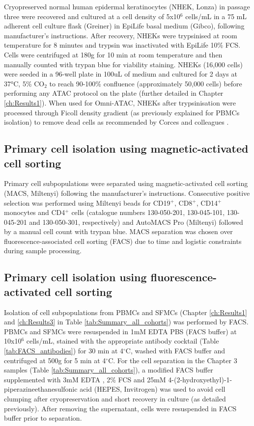 Cryopreserved normal human epidermal keratinocytes (NHEK, Lonza) in passage three were recovered and cultured at a cell density of 5x10$^6$ cells/mL in a 75 mL adherent cell culture flask (Greiner) in EpiLife basal medium (Gibco), following manufacturer's instructions. After recovery, NHEKs were trypsinised at room temperature for 8 minutes and trypsin was inactivated with EpiLife 10\% FCS. Cells were centrifuged at 180g for 10 min at room temperature and then manually counted with trypan blue for viability staining. NHEKs (16,000 cells) were seeded in a 96-well plate in 100uL of medium and cultured for 2 days at 37°C, 5\% CO$_2$ to reach 90-100\% confluence (approximately 50,000 cells) before performing any ATAC protocol on the plate (further detailed in Chapter \ref{ch:Results1}). When used for Omni-ATAC, NHEKs after trypsinisation were processed through Ficoll density gradient (as previously explained for PBMCs isolation) to remove dead cells as recommended by Corces and colleagues \parencite{Corces2017}.


\subsection{Primary cell isolation using magnetic-activated cell sorting}
Primary cell subpopulations were separated using magnetic-activated cell sorting (MACS, Miltenyi) following the manufacturer's instructions. Consecutive positive selection was performed using Miltenyi beads for CD19$^+$, CD8$^+$, CD14$^+$ monocytes and CD4$^+$ cells (catalogue numbers 130-050-201, 130-045-101, 130-045-201 and 130-050-301, respectively) and AutoMACS Pro (Miltenyi) followed by a manual cell count with trypan blue. MACS separation was chosen over fluorescence-associated cell sorting (FACS) due to time and logistic constraints during sample processing.

\subsection{Primary cell isolation using fluorescence-activated cell sorting}
Isolation of cell subpopulations from PBMCs and SFMCs (Chapter \ref{ch:Results1} and \ref{ch:Results3} in Table \ref{tab:Summary_all_cohorts}) was performed by FACS. PBMCs and SFMCs were resuspended in 1mM EDTA PBS (FACS buffer) at 10x10$^6$ cells/mL, stained with the appropriate antibody cocktail (Table \ref{tab:FACS_antibodies}) for 30 min at 4{$^\circ$}C, washed with FACS buffer and centrifuged at 500g for 5 min at 4{$^\circ$}C. For the cell separation in the Chapter 3 samples (Table \ref{tab:Summary_all_cohorts}), a modified FACS buffer supplemented with 3mM EDTA , 2\% FCS and 25mM 4-(2-hydroxyethyl)-1-piperazineethanesulfonic acid (HEPES, Invitrogen) was used to avoid cell clumping after cryopreservation and short recovery in culture (as detailed previously). After removing the supernatant, cells were resuspended in FACS buffer prior to separation. 

